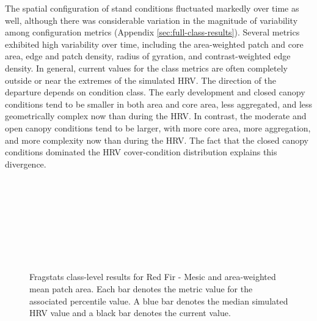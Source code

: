 The spatial configuration of stand conditions fluctuated markedly over time as well, although there was considerable variation in the magnitude of variability among configuration metrics (Appendix \ref{sec:full-class-results}). Several metrics exhibited high variability over time, including the area-weighted patch and core area, edge and patch density, radius of gyration, and contrast-weighted edge density. In general, current values for the class metrics are often completely outside or near the extremes of the simulated HRV. The direction of the departure depends on condition class. The early development and closed canopy conditions tend to be smaller in both area and core area, less aggregated, and less geometrically complex now than during the HRV. In contrast, the moderate and open canopy conditions tend to be larger, with more core area, more aggregation, and more complexity now than during the HRV. The fact that the closed canopy conditions dominated the HRV cover-condition distribution explains this divergence.

\begin{figure}[!htbp]
  \\%
  \\%
    \\%
    \\%
    \\%
    \\%
    \\%
  \caption{Fragstats class-level results for Red Fir - Mesic and area-weighted mean patch area. Each bar denotes the metric value for the associated percentile value. A blue bar denotes the median simulated HRV value and a black bar denotes the current value.}
  \label{fig:rfrm_areaam}
\end{figure}

